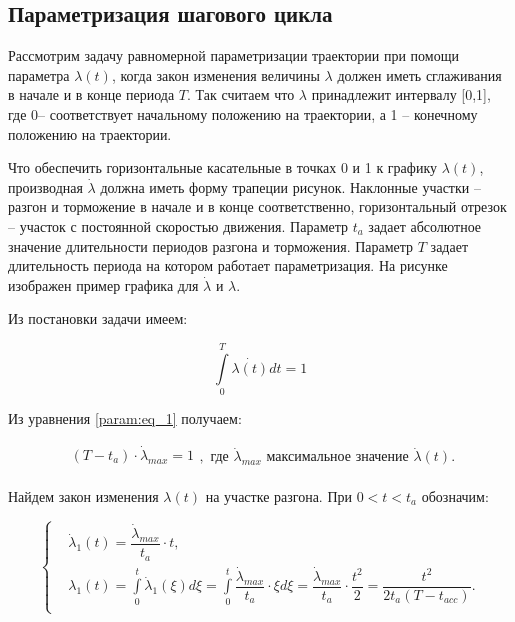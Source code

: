 \subsection{Параметризация шагового цикла}

Рассмотрим задачу равномерной параметризации траектории при помощи параметра $\lambda(t)$, когда закон изменения величины $\lambda$ должен иметь сглаживания в начале и в конце периода $T$. Так считаем что $\lambda$ принадлежит интервалу [0,1], где 0-- соответствует начальному положению на траектории, а 1 -- конечному положению на траектории.

Что обеспечить горизонтальные касательные в точках 0 и 1 к графику $\lambda(t)$, производная $\dot{\lambda}$ должна иметь форму трапеции  рисунок. Наклонные участки -- разгон и торможение в начале и в конце соответственно, горизонтальный отрезок -- участок с постоянной скоростью движения. Параметр $t_a$ задает абсолютное значение длительности периодов разгона и торможения. Параметр $T$ задает длительность периода на котором работает параметризация. На рисунке  изображен пример графика для $\dot{\lambda}$ и $\lambda$.

Из постановки задачи имеем:

\begin{equation}
  \label{param:eq_1}
  \int\limits_0^T\dot{\lambda(t)}dt = 1  
\end{equation}

Из уравнения \ref{param:eq_1} получаем:

\begin{equation}
  \label{param:max_lambda}
\begin{alignedat}{1}
  (T - t_a) \cdot \dot{\lambda}_{max} = 1\\
  \end{alignedat}, \text{ где } \dot{\lambda}_{max}  \text{ максимальное значение } \dot{\lambda}(t).
\end{equation}

Найдем закон изменения $\lambda(t)$ на участке разгона. При $0 < t < t_a$ обозначим:

\begin{equation}
\label{param:case_1}
\left\{
  \begin{alignedat}{1}
    &\dot{\lambda}_1(t) = \dfrac{\dot{\lambda}_{max}}{t_a}\cdot t,\\
    &\lambda_1(t) = \int \limits_0^{t}\dot{\lambda}_1(\xi)d\xi = \int\limits_0^{t}\dfrac{\dot{\lambda}_{max}}{t_a}\cdot{\xi}d\xi = \dfrac{\dot{\lambda}_{max}}{t_a}\cdot \dfrac{t^2}{2} = \dfrac{t^2}{2t_a(T-t_{acc
      })}.\\
  \end{alignedat}
\right.
\end{equation}

